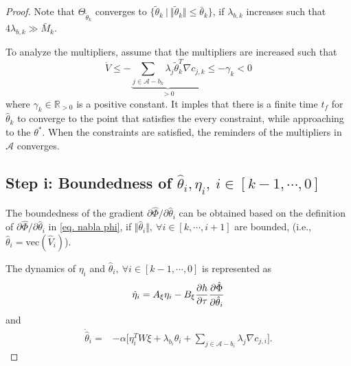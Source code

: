 \documentclass[lettersize,journal]{IEEEtran}
\begin{document}
\begin{proof}
Note that $\Theta_{\tilde\theta_k}$ converges to $\{\tilde\theta_k\  \vert \ \Vert\tilde\theta_k\Vert\le\bar\theta_k\}$, if $\lambda_{b,k}$ increases such that $4\lambda_{b,k} \gg  \bar M_k$.

To analyze the multipliers, assume that the multipliers are increased such that
\begin{equation*}
    \dot V \le - \underbrace{
    \sum_{j\in\mathcal{A}-b_k}\lambda_j\tilde\theta_k^T\nabla c_{j,k}
    }_{>0}	\le -\gamma_k <0
\end{equation*}
where $\gamma_k\in\mathbb R_{>0}$ is a positive constant.
It imples that there is a finite time $t_f$ for $\hat\theta_k$ to converge to the point that satisfies the every constraint, while approaching to the $\theta^*$.
When the constraints are satisfied, the reminders of the multipliers in $\mathcal A$ converges.

\subsection*{Step i: Boundedness of $\hat\theta_i,\eta_i,\ i\in[k-1,\cdots,0]$}


The boundedness of the gradient $\partial\hat\Phi/\partial \hat\theta_i$ can be obtained based on the definition of $\partial\hat\Phi/\partial\hat\theta_i$ in \eqref{eq. nabla phi}, if $\Vert\hat\theta_i\Vert,\ \forall i\in[k,\cdots,i+1]$ are bounded, (i.e., $\hat\theta_i=\text{vec}(\hat V_i)$).

The dynamics of $\eta_i$ and $\hat\theta_i,\ \forall i\in [k-1,\cdots,0]$ is represented as
\begin{equation*}
    \dot\eta_i = 
    A_\xi\eta_i -B_\xi {\partial h\over\partial\tau}
    {\partial \hat\Phi\over \partial \hat\theta_i}
\end{equation*}
and
\begin{equation*}
    \begin{aligned}
        \dot{\hat\theta}_i 
        =&
        -\alpha 
        \bigg[
            \eta_i^TW\xi+\lambda_{b_i} \hat\theta_i
            +
            \sum_{j\in\mathcal{A}-b_i}\lambda_j\nabla c_{j,i}
        \bigg].
    \end{aligned}
\end{equation*}


\end{proof}
\end{document}
